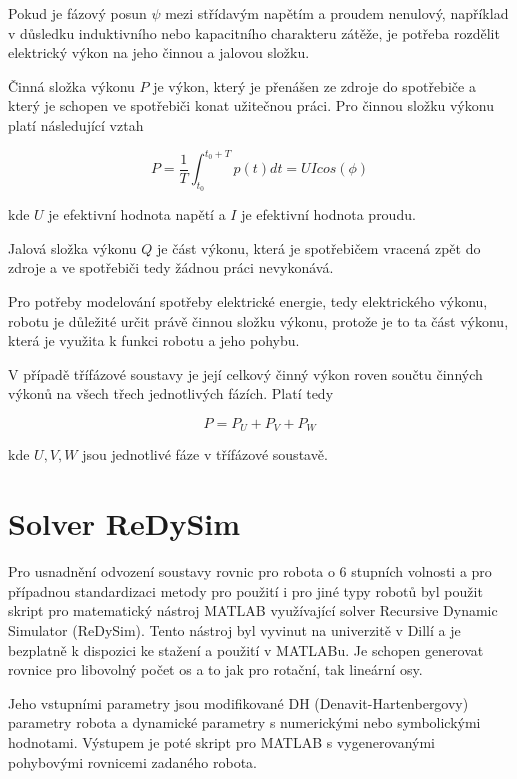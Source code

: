 Pokud je fázový posun $\psi$ mezi střídavým napětím a proudem nenulový, například v důsledku induktivního nebo kapacitního charakteru zátěže, je potřeba rozdělit elektrický výkon na jeho činnou a jalovou složku. 

Činná složka výkonu $P$ je výkon, který je přenášen ze zdroje do spotřebiče a který je schopen ve spotřebiči konat užitečnou práci. Pro činnou složku výkonu platí následující vztah

\begin{equation}
P = \frac{1}{T} \int_{t_0}^{t_0 + T} p(t)dt = UIcos(\phi)
\label{act_power_eq}
\end{equation}  

kde $U$ je efektivní hodnota napětí a $I$ je efektivní hodnota proudu.

Jalová složka výkonu $Q$ je část výkonu, která je spotřebičem vracená zpět do zdroje a ve spotřebiči tedy žádnou práci nevykonává.

Pro potřeby modelování spotřeby elektrické energie, tedy elektrického výkonu, robotu je důležité určit právě činnou složku výkonu, protože je to ta část výkonu, která je využita k funkci robotu a jeho pohybu. 

V případě třífázové soustavy je její celkový činný výkon roven součtu činných výkonů na všech třech jednotlivých fázích. Platí tedy

\begin{equation}
P = P_U + P_V + P_W
\label{3ph_power_eq}
\end{equation}  

kde $U,V,W$ jsou jednotlivé fáze v třífázové soustavě.


\section{Solver ReDySim}

Pro usnadnění odvození soustavy rovnic pro robota o 6 stupních volnosti a pro případnou standardizaci metody pro použití i pro jiné typy robotů byl použit skript pro matematický nástroj MATLAB využívající solver Recursive Dynamic Simulator (ReDySim)\cite{redysim}. Tento nástroj byl vyvinut na univerzitě v Dillí a je bezplatně k dispozici ke stažení a použití v MATLABu. Je schopen generovat rovnice pro libovolný počet os a to jak pro rotační, tak lineární osy. 

Jeho vstupními parametry jsou modifikované DH (Denavit-Hartenbergovy) parametry robota a dynamické parametry s numerickými nebo symbolickými hodnotami. Výstupem je poté skript pro MATLAB s vygenerovanými pohybovými rovnicemi zadaného robota.  

